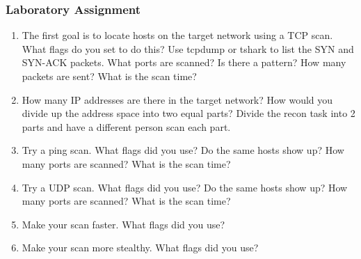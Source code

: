 \documentclass[11pt]{report}
\begin{document}
\subsubsection{Laboratory Assignment}
\begin{enumerate}
  \item The first goal is to locate hosts on the target network using a TCP scan.  What flags do you
    set to do this?  Use tcpdump or tshark to list the SYN and SYN-ACK packets.  What ports are 
    scanned?  Is there a pattern?
    How many packets are sent?  What is the scan time?
  \item How many IP addresses are there in the target network?  How would you divide up the address space
    into two equal parts?  Divide the recon task into 2 parts and have a different person scan each part.
  \item Try a ping scan.  What flags did you use?  Do the same hosts show up?  How many ports are
    scanned?  What is the scan time?
  \item Try a UDP scan. What flags did you use?  Do the same hosts show up?  How many ports are
    scanned?  What is the scan time?
  \item Make your scan faster.  What flags did you use?
  \item Make your scan more stealthy.  What flags did you use?
\end{enumerate}
\end{document}
